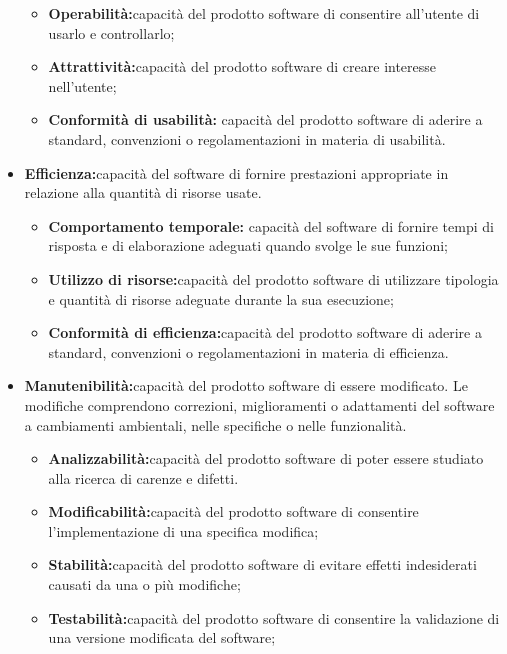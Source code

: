 \documentclass[12pt,a4paper]{article}
\begin{document}
\begin{itemize}
\begin{itemize}
\item\textbf{Operabilità:}capacità del prodotto software di consentire all’utente di usarlo e controllarlo;

\item\textbf{Attrattività:}capacità del prodotto software di creare interesse nell’utente;

\item\textbf{Conformità di usabilità: }capacità del prodotto software di aderire a standard, convenzioni o regolamentazioni in materia di usabilità.

\end{itemize}
\item\textbf{Efficienza:}capacità del software di fornire prestazioni appropriate in relazione alla quantità di risorse usate.
\begin{itemize}
\item\textbf{Comportamento temporale: }capacità del software di fornire tempi di risposta e di elaborazione adeguati quando svolge le sue funzioni;
\item\textbf{Utilizzo di risorse:}capacità del prodotto software di utilizzare tipologia e quantità di risorse adeguate durante la sua esecuzione;

\item\textbf{Conformità di efficienza:}capacità del prodotto software di aderire a standard, convenzioni o regolamentazioni in materia di efficienza.
\end{itemize}
\item\textbf{Manutenibilità:}capacità del prodotto software di essere modificato. Le modifiche comprendono correzioni, miglioramenti o adattamenti del software a cambiamenti ambientali, nelle specifiche o nelle funzionalità.
\begin{itemize}
\item\textbf{Analizzabilità:}capacità del prodotto software di poter essere studiato alla ricerca di carenze e difetti.

\item\textbf{Modificabilità:}capacità del prodotto software di consentire l’implementazione di una specifica modifica;

\item\textbf{Stabilità:}capacità del prodotto software di evitare effetti indesiderati causati da una o più modifiche;
\item\textbf{Testabilità:}capacità del prodotto software di consentire la validazione di una versione modificata del software;


\end{itemize}
\end{itemize}
\end{document}
